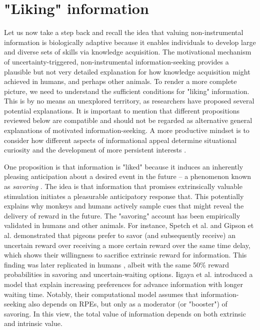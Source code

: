 \section{"Liking" information}

Let us now take a step back and recall the idea that valuing non-instrumental information is biologically adaptive because it enables individuals to develop large and diverse sets of skills via knowledge acquisition. The motivational mechanism of uncertainty-triggered, non-instrumental information-seeking provides a plausible but not very detailed explanation for how knowledge acquisition might achieved in humans, and perhaps other animals. To render a more complete picture, we need to understand the sufficient conditions for "liking" information. This is by no means an unexplored territory, as researchers have proposed several potential explanations. It is important to mention that different propositions reviewed below are compatible and should not be regarded as alternative general explanations of motivated information-seeking. A more productive mindset is to consider how different aspects of informational appeal determine situational curiosity and the development of more persistent interests \cite{kobayashi_diverse_2019,bromberg-martin_value_2020,fitzgibbon_lure_2021}.

One proposition is that information is "liked" because it induces an inherently pleasing anticipation about a desired event in the future -- a phenomenon known as \emph{savoring} \cite{loewenstein_anticipation_1987}. The idea is that information that promises extrinsically valuable stimulation initiates a pleasurable anticipatory response that. This potentially explains why monkeys \cite{bromberg-martin_midbrain_2009,bromberg-martin_lateral_2011} and humans \cite{van_lieshout_induction_2018,kobayashi_diverse_2019} actively sample cues that might reveal the delivery of reward in the future. The "savoring" account has been empirically validated in humans and other animals. For instance, Spetch et al. \cite{spetch_suboptimal_1990} and Gipson et al. \cite{gipson_preference_2009} demonstrated that pigeons prefer to savor (and subsequently receive) an uncertain reward over receiving a more certain \cite[up to 100\% certain in][]{spetch_suboptimal_1990} reward over the same time delay, which shows their willingness to sacrifice extrinsic reward for information. This finding was later replicated in humans \cite{iigaya_modulation_2016}, albeit with the same 50\% reward probabilities in savoring and uncertain-waiting options. Iigaya et al. \cite{iigaya_modulation_2016} introduced a model that explain increasing preferences for advance information with longer waiting time. Notably, their computational model assumes that information-seeking also depends on \acp{RPE}, but only as a moderator (or "booster") of savoring. In this view, the total value of information depends on both extrinsic and intrinsic value.

